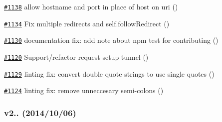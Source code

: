 \begin{DoxyItemize}
\item \href{https://github.com/request/request/pull/1138}{\tt \#1138} allow hostname and port in place of host on uri ()
\item \href{https://github.com/request/request/pull/1134}{\tt \#1134} Fix multiple redirects and {\ttfamily self.\+follow\+Redirect} ()
\item \href{https://github.com/request/request/pull/1130}{\tt \#1130} documentation fix\+: add note about npm test for contributing ()
\item \href{https://github.com/request/request/pull/1120}{\tt \#1120} Support/refactor request setup tunnel ()
\item \href{https://github.com/request/request/pull/1129}{\tt \#1129} linting fix\+: convert double quote strings to use single quotes ()
\item \href{https://github.com/request/request/pull/1124}{\tt \#1124} linting fix\+: remove unneccesary semi-\/colons ()
\end{DoxyItemize}

\subsubsection*{v2.. (2014/10/06)}


